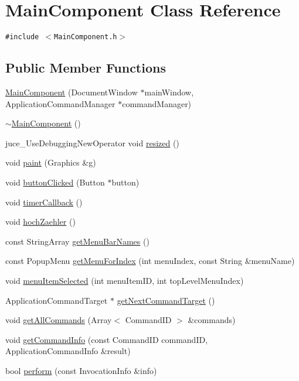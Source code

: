 \hypertarget{class_main_component}{
\section{MainComponent Class Reference}
\label{class_main_component}
}
{\tt \#include $<$MainComponent.h$>$}

\subsection*{Public Member Functions}
\begin{CompactItemize}
\item 
\hyperlink{class_main_component_1239f0e24e2bcfc66e4791956f67e2d0}{MainComponent} (DocumentWindow $\ast$mainWindow, ApplicationCommandManager $\ast$commandManager)
\item 
\hyperlink{class_main_component_a96a2a286f35edf4000deec5f327d1c3}{$\sim$MainComponent} ()
\item 
juce\_\-UseDebuggingNewOperator void \hyperlink{class_main_component_175ec763d2e13c0140e17c1113662741}{resized} ()
\item 
void \hyperlink{class_main_component_50314e605b634b982cd4550ee9e48139}{paint} (Graphics \&g)
\item 
void \hyperlink{class_main_component_30edcb9bd53a38eb4268689b3323828b}{buttonClicked} (Button $\ast$button)
\item 
void \hyperlink{class_main_component_f5189d8f0352afb781ba57404b732edb}{timerCallback} ()
\item 
void \hyperlink{class_main_component_47a6bdef6f95e11da90fd34fb2361349}{hochZaehler} ()
\item 
const StringArray \hyperlink{class_main_component_c17ad22bd3512871f0cb44462551e3d2}{getMenuBarNames} ()
\item 
const PopupMenu \hyperlink{class_main_component_a4cf0e0810822da0005fe2d1acb0a44c}{getMenuForIndex} (int menuIndex, const String \&menuName)
\item 
void \hyperlink{class_main_component_0a2ea996cdf1ed8cba668dc7f4bbb958}{menuItemSelected} (int menuItemID, int topLevelMenuIndex)
\item 
ApplicationCommandTarget $\ast$ \hyperlink{class_main_component_8abcff99d8e49093f0d023d371e45231}{getNextCommandTarget} ()
\item 
void \hyperlink{class_main_component_1688430c1a50a254245f2607eaad1e04}{getAllCommands} (Array$<$ CommandID $>$ \&commands)
\item 
void \hyperlink{class_main_component_9fe9c493192ad557a820d6077065b05c}{getCommandInfo} (const CommandID commandID, ApplicationCommandInfo \&result)
\item 
bool \hyperlink{class_main_component_dd5b051a034f5cfef8584290af48b15c}{perform} (const InvocationInfo \&info)
\end{CompactItemize}
